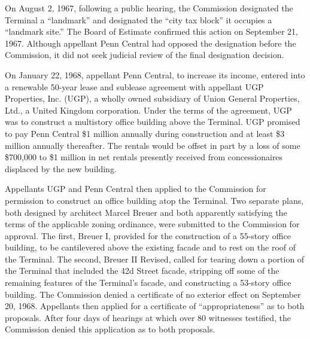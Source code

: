On August 2, 1967, following a public hearing, the Commission designated the
Terminal a ``landmark'' and designated the ``city tax block'' it occupies a
``landmark site.'' The Board of Estimate confirmed this action on September 21,
1967. Although appellant Penn Central had opposed the designation before the
Commission, it did not seek judicial review of the final designation decision.

On January 22, 1968, appellant Penn Central, to increase its income, entered
into a renewable 50-year lease and sublease agreement with appellant UGP
Properties, Inc. (UGP), a wholly owned subsidiary of Union General Properties,
Ltd., a United Kingdom corporation. Under the terms of the agreement, UGP was to
construct a multistory office building above the Terminal. UGP promised to pay
Penn Central \$1 million annually during construction and at least \$3 million
annually thereafter. The rentals would be offset in part by a loss of some
\$700,000 to \$1 million in net rentals presently received from concessionaires
displaced by the new building.

Appellants UGP and Penn Central then applied to the Commission for permission to
construct an office building atop the Terminal. Two separate plans, both
designed by architect Marcel Breuer and both apparently satisfying the terms of
the applicable zoning ordinance, were submitted to the Commission for approval.
The first, Breuer I, provided for the construction of a 55-story office
building, to be cantilevered above the existing facade and to rest on the roof
of the Terminal. The second, Breuer II Revised, called for tearing down a
portion of the Terminal that included the 42d Street facade, stripping off some
of the remaining features of the Terminal's facade, and constructing a 53-story
office building. The Commission denied a certificate of no exterior effect on
September 20, 1968. Appellants then applied for a certificate of
``appropriateness'' as to both proposals. After four days of hearings at which
over 80 witnesses testified, the Commission denied this application as to both
proposals.


